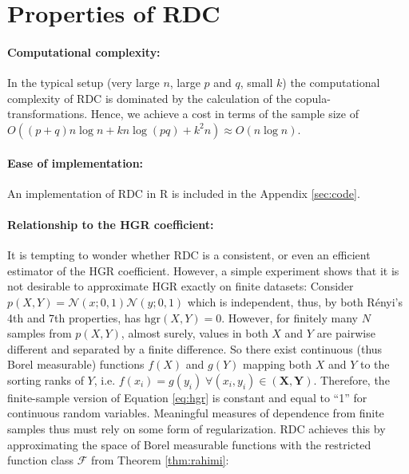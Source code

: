 \documentclass{article}
\begin{document}
\section{Properties of RDC}\label{sec:rdc_prop}
\paragraph{Computational complexity:} In the typical setup (very large $n$,
large $p$ and $q$, small $k$) the computational complexity of RDC is dominated
by the calculation of the copula-transformations. Hence, we achieve a cost in
terms of the sample size of $O((p+q) n \log n + kn\log(pq) + k^2n) \approx O(n
\log n)$. 

\paragraph{Ease of implementation:} An implementation of RDC in R is included
in the Appendix \ref{sec:code}.

\paragraph{Relationship to the HGR coefficient:} \label{sec:relat-hgr}
It is tempting to wonder whether RDC is a consistent, or even an efficient
estimator of the HGR coefficient. However, a simple experiment shows
that it is not desirable to approximate HGR exactly on finite datasets:
Consider $p(X,Y)=\mathcal{N}(x;0,1)\mathcal{N}(y;0,1)$ which is independent,
thus, by both R\'enyi's 4th and 7th properties, has $\mathrm{hgr}(X,Y)=0$.
However, for finitely many $N$ samples from $p(X,Y)$, almost surely, values in
both $X$ and $Y$ are pairwise different and separated by a finite difference.
So there exist continuous (thus Borel measurable) functions $f(X)$ and $g(Y)$
mapping both $X$ and $Y$ to the sorting ranks of $Y$, i.e.
$f(x_i)=g(y_i)\;\forall (x_i,y_i)\in(\bm X,\bm Y)$. Therefore, the
finite-sample version of Equation \eqref{eq:hgr} is constant and equal to ``1'' 
for continuous random variables. Meaningful measures of dependence from finite
  samples thus must rely on some form of regularization. RDC achieves this by
  approximating the space of Borel measurable functions with the restricted
  function class $\mathcal{F}$ from Theorem \ref{thm:rahimi}:
\end{document}
